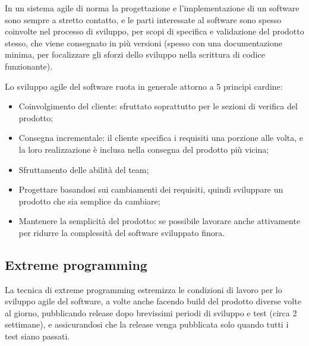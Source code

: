 \documentclass[a4paper, 10pt]{article}
\begin{document}
		In un sistema agile di norma la progettazione e l'implementazione di un software sono sempre a stretto contatto, e le parti interessate al software sono spesso coinvolte nel processo di sviluppo, per scopi di specifica e validazione del prodotto stesso, che viene consegnato in più versioni (spesso con una documentazione minima, per focalizzare gli sforzi dello sviluppo nella scrittura di codice funzionante).
		
		Lo sviluppo agile del software ruota in generale attorno a 5 principi cardine:
		\begin{itemize}
			\item Coinvolgimento del cliente: sfruttato soprattutto per le sezioni di verifica del prodotto;
			
			\item Consegna incrementale: il cliente specifica i requisiti una porzione alle volta, e la loro realizzazione è inclusa nella consegna del prodotto più vicina;
			
			\item Sfruttamento delle abilità del team;
			
			\item Progettare basandosi sui cambiamenti dei requisiti, quindi sviluppare un prodotto che sia semplice da cambiare;
			
			\item Mantenere la semplicità del prodotto: se possibile lavorare anche attivamente per ridurre la complessità del software sviluppato finora.
		\end{itemize}
	
		\subsection*{Extreme programming}
		La tecnica di extreme programming estremizza le condizioni di lavoro per lo sviluppo agile del software, a volte anche facendo build del prodotto diverse volte al giorno, pubblicando release dopo brevissimi periodi di sviluppo e test (circa 2 settimane), e assicurandosi che la release venga pubblicata solo quando tutti i test siano passati.
		
\end{document}
